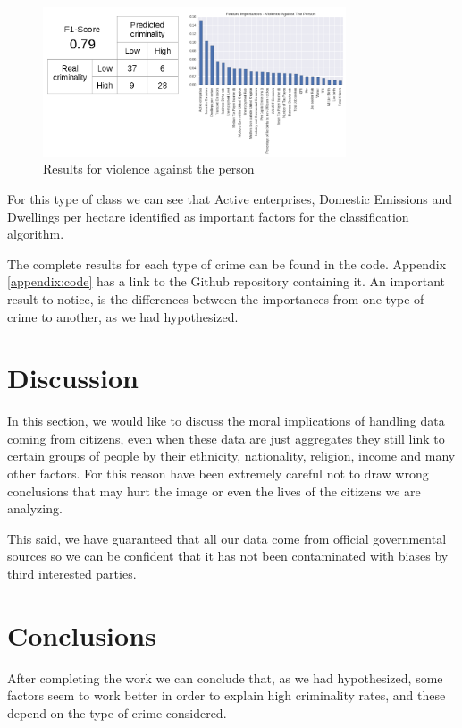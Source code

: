 \documentclass[12pt, openany]{report}
\begin{document}
\begin{figure}[h!]
\centering
        \includegraphics[width=0.8\textwidth]{images/results_violence_person.png}
        \caption{Results for violence against the person}
\end{figure}

For this type of class we can see that Active enterprises, Domestic Emissions and Dwellings per hectare identified as important factors for the classification algorithm.


The complete results for each type of crime can be found in the code. Appendix \ref{appendix:code} has a link to the Github repository containing it. An important result to notice, is the differences between the importances from one type of crime to another, as we had hypothesized.

\section{Discussion}

In this section, we would like to discuss the moral implications of handling data coming from citizens, even when these data are just aggregates they still link to certain groups of people by their ethnicity, nationality, religion, income and many other factors. For this reason have been extremely careful not to draw wrong conclusions that may hurt the image or even the lives of the citizens we are analyzing.

This said, we have guaranteed that all our data come from official governmental sources so we can be confident that it has not been contaminated with biases by third interested parties.

\section{Conclusions}

After completing the work we can conclude that, as we had hypothesized, some factors seem to work better in order to explain high criminality rates, and these depend on the type of crime considered.
\end{document}
